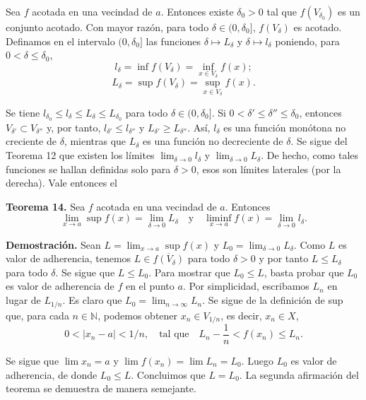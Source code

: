 \documentclass[12pt,oneside]{book}
\begin{document}
Sea \( f \) acotada en una vecindad de \( a \). Entonces existe \( \delta_0 > 0 \) tal que \( f(V_{\delta_0}) \) es un conjunto acotado. Con mayor razón, para todo \( \delta \in (0, \delta_0] \), \( f(V_{\delta}) \) es acotado. Definamos en el intervalo \( (0, \delta_0] \) las funciones \( \delta \mapsto L_{\delta} \) y \( \delta \mapsto l_{\delta} \) poniendo, para \( 0 < \delta \leq \delta_0 \),
\[
l_{\delta} = \inf f(V_{\delta}) = \inf_{x \in V_{\delta}} f(x);
\]
\[
L_{\delta} = \sup f(V_{\delta}) = \sup_{x \in V_{\delta}} f(x).
\]

Se tiene \( l_{\delta_0} \leq l_{\delta} \leq L_{\delta} \leq L_{\delta_0} \) para todo \( \delta \in (0, \delta_0] \). Si \( 0 < \delta' \leq \delta'' \leq \delta_0 \), entonces \( V_{\delta'} \subset V_{\delta''} \) y, por tanto, \( l_{\delta'} \leq l_{\delta''} \) y \( L_{\delta'} \geq L_{\delta''} \). Así, \( l_{\delta} \) es una función monótona no creciente de \( \delta \), mientras que \( L_{\delta} \) es una función no decreciente de \( \delta \). Se sigue del Teorema 12 que existen los límites \( \lim_{\delta \to 0} l_{\delta} \) y \( \lim_{\delta \to 0} L_{\delta} \). De hecho, como tales funciones se hallan definidas solo para \( \delta > 0 \), esos son límites laterales (por la derecha). Vale entonces el

\textbf{Teorema 14.} Sea \( f \) acotada en una vecindad de \( a \). Entonces
\[
\lim_{x \to a} \sup f(x) = \lim_{\delta \to 0} L_{\delta} \quad \text{y} \quad \liminf_{x \to a} f(x) = \lim_{\delta \to 0} l_{\delta}.
\]

\textbf{Demostración.} Sean \( L = \lim_{x \to a} \sup f(x) \) y \( L_0 = \lim_{\delta \to 0} L_{\delta} \). Como \( L \) es valor de adherencia, tenemos \( L \in \overline{f(V_{\delta})} \) para todo \( \delta > 0 \) y por tanto \( L \leq L_{\delta} \) para todo \( \delta \). Se sigue que \( L \leq L_0 \). Para mostrar que \( L_0 \leq L \), basta probar que \( L_0 \) es valor de adherencia de \( f \) en el punto \( a \). Por simplicidad, escribamos \( L_n \) en lugar de \( L_{1/n} \). Es claro que \( L_0 = \lim_{n \to \infty} L_n \). Se sigue de la definición de sup que, para cada \( n \in \mathbb{N} \), podemos obtener \( x_n \in V_{1/n} \), es decir, \( x_n \in X \),
\[
0 < |x_n - a| < 1/n, \quad \text{tal que} \quad L_n - \frac{1}{n} < f(x_n) \leq L_n.
\]

Se sigue que \(\lim x_n = a\) y \(\lim f(x_n) = \lim L_n = L_0\). Luego \(L_0\) es valor de adherencia, de donde \(L_0 \leq L\). Concluimos que \(L = L_0\). La segunda afirmación del teorema se demuestra de manera semejante.
\end{document}
